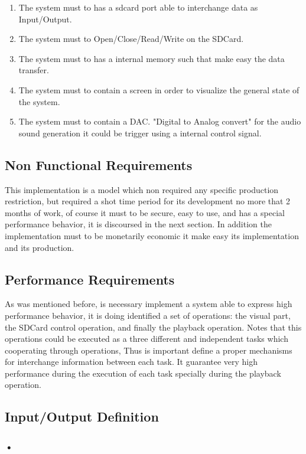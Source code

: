 \begin{enumerate}
\item The system must to has a sdcard port able to interchange data as Input/Output.
\item The system must to Open/Close/Read/Write on the SDCard. 
\item The system must to has a internal memory such that make easy the data transfer. 
\item The system must to contain a screen in order to visualize the general state of the system.  
\item The system must to contain a DAC. "Digital to Analog convert" for the audio sound generation it could be trigger using a internal control signal.
\end{enumerate}

\subsection{Non Functional Requirements}
This implementation is a model which non required any specific production restriction, but required a shot time period for its development no more that 2 months of work, of course it must to be secure, easy to use, and has a special performance behavior, it is discoursed in the next section. In addition the implementation must to be monetarily economic it make easy its implementation and its production. 

\subsection{Performance Requirements}
As was mentioned before, is necessary implement a system able to express high performance behavior, it is doing  identified a set of operations: the visual part, the SDCard control operation, and finally the playback operation. Notes that this operations could be executed as a three different and independent tasks which cooperating through operations, Thus is important define a proper mechanisms for interchange information between each task. It guarantee very high performance during the execution of each task specially during the playback operation. 

\subsection{Input/Output Definition}


\subsubsection{•}

